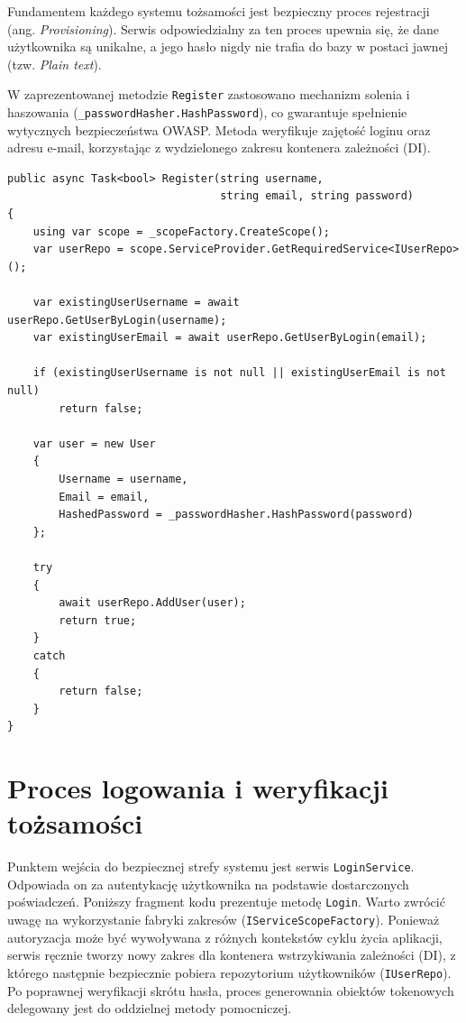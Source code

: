 \documentclass{SGGW-thesis}
\begin{document}
Fundamentem każdego systemu tożsamości jest bezpieczny proces rejestracji (ang. \textit{Provisioning}). Serwis odpowiedzialny za ten proces upewnia się, że dane użytkownika są unikalne, a jego hasło nigdy nie trafia do bazy w postaci jawnej (tzw. \textit{Plain text}). 

W zaprezentowanej metodzie \texttt{Register} zastosowano mechanizm solenia i haszowania (\texttt{\_passwordHasher.HashPassword}), co gwarantuje spełnienie wytycznych bezpieczeństwa OWASP. Metoda weryfikuje zajętość loginu oraz adresu e-mail, korzystając z wydzielonego zakresu kontenera zależności (DI).

\vspace{2cm}

\begin{minipage}{\textwidth}
\begin{lstlisting}
public async Task<bool> Register(string username, 
                                 string email, string password)
{
    using var scope = _scopeFactory.CreateScope();
    var userRepo = scope.ServiceProvider.GetRequiredService<IUserRepo>();

    var existingUserUsername = await userRepo.GetUserByLogin(username);
    var existingUserEmail = await userRepo.GetUserByLogin(email);

    if (existingUserUsername is not null || existingUserEmail is not null)
        return false;

    var user = new User
    {
        Username = username,
        Email = email,
        HashedPassword = _passwordHasher.HashPassword(password)
    };

    try
    {
        await userRepo.AddUser(user);
        return true;
    }
    catch
    {
        return false;
    }
}
\end{lstlisting}
\end{minipage}

\clearpage

\section{Proces logowania i weryfikacji tożsamości}

Punktem wejścia do bezpiecznej strefy systemu jest serwis \texttt{LoginService}. Odpowiada on za autentykację użytkownika na podstawie dostarczonych poświadczeń. 
Poniższy fragment kodu prezentuje metodę \texttt{Login}. Warto zwrócić uwagę na wykorzystanie fabryki zakresów (\texttt{IServiceScopeFactory}). Ponieważ autoryzacja może być wywoływana z różnych kontekstów cyklu życia aplikacji, serwis ręcznie tworzy nowy zakres dla kontenera wstrzykiwania zależności (DI), z którego następnie bezpiecznie pobiera repozytorium użytkowników (\texttt{IUserRepo}). Po poprawnej weryfikacji skrótu hasła, proces generowania obiektów tokenowych delegowany jest do oddzielnej metody pomocniczej.
\end{document}
